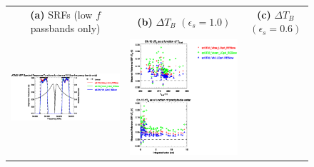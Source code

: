 \begin{figure}[H]
  \centering
  \begin{tabular}{c c c}
    \textsf{\textbf{(a)} SRFs (low $f$ passbands only)} &
    \textsf{\textbf{(b)} $\Delta T_B$ $(\epsilon_s = 1.0)$} &
    \textsf{\textbf{(c)} $\Delta T_B$ $(\epsilon_s = 0.6)$} \\
    \includegraphics[bb=80 400 280 558,clip,scale=0.85]{graphics/srf/Vset/atms_npp.ch15.osrf.eps} &
    \includegraphics[bb=85 400 260 558,clip,scale=0.85]{graphics/dtb/Vset/e1.0_r0.0/atms_npp.ch15.dTb.eps} & 

\end{tabular}
\end{figure}
